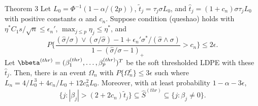 \begin{frame}
\begin{block} {Theorem 3}
\scriptsize
    Let $L_0=\Phi^{-1}(1-\alpha/(2p))$, $\tilde{t}_j = \tau_j\sigma L_0$, and
$\hat{t}_j = (1+{c}_n)\sigma\tau_j L_0$ with positive constants $\alpha$ and ${c}_n$. Suppose
condition (queshao) holds with $\eta^*C_1s/\sqrt{n}\leq \epsilon_n'$, $\max_{j\leq p}\eta_j\leq \eta^*$, and
\begin{equation}
P\Big\{\frac{(\hat{\sigma}/\sigma)\vee(\sigma/\hat{\sigma}) -1 + \epsilon_n'\sigma^*/(\hat{\sigma} \wedge \sigma)}
{1-(\hat{\sigma}/\sigma-1)_+ } > {c}_n\Big\} \leq 2\epsilon.
\end{equation}
    Let $\bbeta^{(thr)} = (\beta_1^{(thr)},\ldots,\beta_p^{(thr)})^T$ be the {soft} thresholded LDPE
with these $\hat{t}_j$.
Then, there is an event $\Omega_n$ with $P\{\Omega_n^c\} \leq 3 \epsilon$ such %
where $L_n = 4/L_0^3+4{c}_n/L_0+12{c}_n^2L_0$.
Moreover, with at least probability $1-\alpha - 3\epsilon$,
\begin{equation}
\{j: |\beta_j|> (2+2{c}_n)\tilde{t}_j\} \subseteq \hat{S}^{(thr)} \subseteq \{j:\beta_j\neq 0\}.
\end{equation}
\end{block}
\end{frame}


